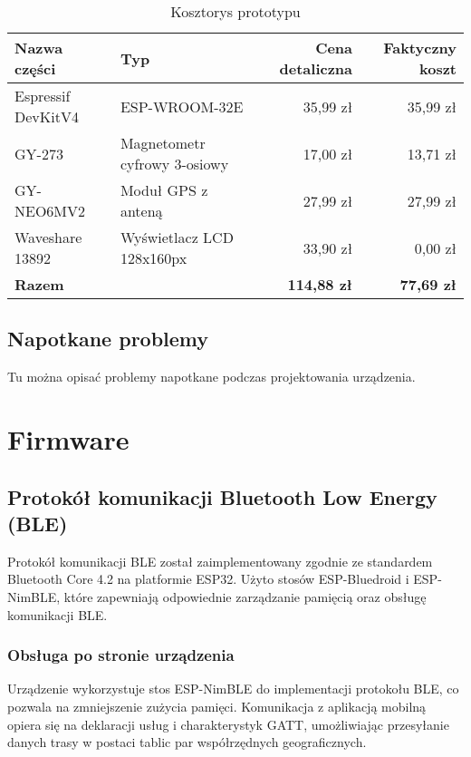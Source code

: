 \begin{table}[h]
    \centering
    \begin{tabular}{|l|l|r|r|}
        \hline
        \textbf{Nazwa części} & \textbf{Typ}                 & \textbf{Cena detaliczna} & \textbf{Faktyczny koszt} \\ \hline
        Espressif DevKitV4    & ESP-WROOM-32E                & 35,99 zł                 & 35,99 zł                 \\ \hline
        GY-273                & Magnetometr cyfrowy 3-osiowy & 17,00 zł                 & 13,71 zł                 \\ \hline
        GY-NEO6MV2            & Moduł GPS z anteną           & 27,99 zł                 & 27,99 zł                 \\ \hline
        Waveshare 13892       & Wyświetlacz LCD 128x160px    & 33,90 zł                 & 0,00 zł                  \\ \hline
        \textbf{Razem}        &                              & \textbf{114,88 zł}       & \textbf{77,69 zł}        \\ \hline
    \end{tabular}
    \caption{Kosztorys prototypu}
\end{table}
\subsection{Napotkane problemy}
Tu można opisać problemy napotkane podczas projektowania urządzenia.

\section{Firmware}
\subsection{Protokół komunikacji Bluetooth Low Energy (BLE)}
Protokół komunikacji BLE został zaimplementowany zgodnie ze standardem Bluetooth Core 4.2 na platformie ESP32. Użyto stosów ESP-Bluedroid i ESP-NimBLE, które zapewniają odpowiednie zarządzanie pamięcią oraz obsługę komunikacji BLE.

\subsubsection{Obsługa po stronie urządzenia}
Urządzenie wykorzystuje stos ESP-NimBLE do implementacji protokołu BLE, co pozwala na zmniejszenie zużycia pamięci. Komunikacja z aplikacją mobilną opiera się na deklaracji usług i charakterystyk GATT, umożliwiając przesyłanie danych trasy w postaci tablic par współrzędnych geograficznych.

